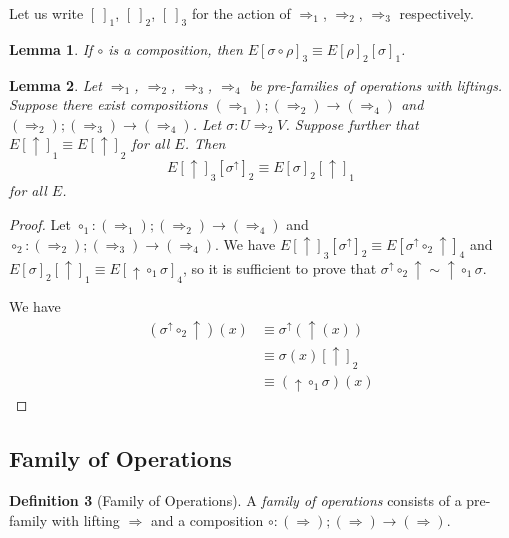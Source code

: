 \documentclass{article}
\newtheorem{lm}{Lemma}[section]
\theoremstyle{definition}
\newtheorem{df}[lm]{Definition}
\begin{document}

Let us write $[\ ]_1$, $[\ ]_2$, $[\ ]_3$ for the action of $\Rightarrow_1$, $\Rightarrow_2$, $\Rightarrow_3$ respectively.

\begin{lm}
 If $\circ$ is a composition, then $E[\sigma \circ \rho]_3 \equiv E [ \rho ]_2 [ \sigma ]_1$.
\end{lm}


\begin{lm}
 Let $\Rightarrow_1$, $\Rightarrow_2$, $\Rightarrow_3$, $\Rightarrow_4$ be pre-families of operations with liftings.  Suppose there exist compositions
 $(\Rightarrow_1); (\Rightarrow_2) \rightarrow (\Rightarrow_4)$ and $(\Rightarrow_2); (\Rightarrow_3) \rightarrow (\Rightarrow_4)$.  Let $\sigma : U \Rightarrow_2 V$.
 Suppose further that $E[\uparrow]_1 \equiv E[\uparrow]_2$ for all $E$.  Then
 \[ E [\uparrow]_3 [\sigma^\uparrow]_2 \equiv E [\sigma]_2 [\uparrow]_1 \]
 for all $E$.
\end{lm}


\begin{proof}
Let $\circ_1 : (\Rightarrow_1); (\Rightarrow_2) \rightarrow (\Rightarrow_4)$ and $\circ_2 : (\Rightarrow_2); (\Rightarrow_3) \rightarrow (\Rightarrow_4)$.
 We have $E[\uparrow]_3 [\sigma^\uparrow]_2 \equiv E [\sigma^\uparrow \circ_2 \uparrow]_4$ and $E [\sigma]_2 [\uparrow]_1 \equiv E [\uparrow \circ_1 \sigma]_4$,
 so it is sufficient to prove that $\sigma^\uparrow \circ_2 \uparrow \sim \uparrow \circ_1 \sigma$.
 
 We have
 \begin{align*}
  (\sigma^\uparrow \circ_2 \uparrow)(x) & \equiv \sigma^\uparrow(\uparrow(x)) \\
  & \equiv \sigma(x) [\uparrow]_2 \\
  & \equiv (\uparrow \circ_1 \sigma)(x)
 \end{align*}
\end{proof}

\subsection{Family of Operations}

\begin{df}[Family of Operations]
 A \emph{family of operations} consists of a pre-family with lifting $\Rightarrow$ and a composition $\circ : (\Rightarrow) ; (\Rightarrow) \rightarrow (\Rightarrow)$.
\end{df}

\end{document}
